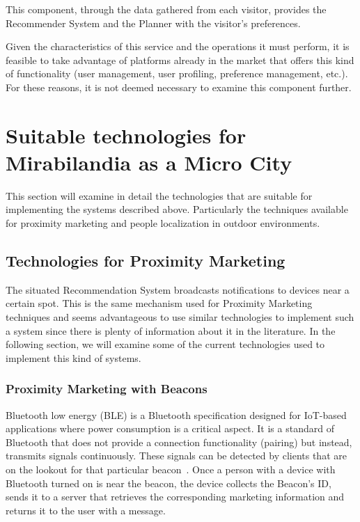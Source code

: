 This component, through the data gathered from each visitor, provides the Recommender System and the Planner with the visitor's preferences.

Given the characteristics of this service and the operations it must perform, it is feasible to take advantage of platforms already in the market that offers this kind of functionality (user management, user profiling, preference management, etc.).
For these reasons, it is not deemed necessary to examine this component further.

\section{Suitable technologies for Mirabilandia as a Micro City}
This section will examine in detail the technologies that are suitable for implementing the systems described above. Particularly the techniques
available for proximity marketing and people localization in outdoor environments.

\subsection{Technologies for Proximity Marketing}\label{sec:proximity-marketing-technologies}
The situated Recommendation System broadcasts notifications to devices near a certain spot. This is the same mechanism used for Proximity Marketing
techniques and seems advantageous to use similar technologies to implement such a system since there is plenty of information about it in the literature. In the following section, we will examine some of the current technologies used to implement this kind of systems.

\subsubsection{Proximity Marketing with Beacons}\label{sec:proximity-marketing-with-beacons}
Bluetooth low energy (BLE) is a Bluetooth specification designed for IoT-based applications where power consumption is a critical aspect. It is a
standard of Bluetooth that does not provide a connection functionality (pairing) but instead, transmits signals continuously. These signals can be
detected by clients that are on the lookout for that particular beacon~\cite{muddinagiri2020implementation}. Once a person with a device with
Bluetooth turned on is near the beacon, the device collects the Beacon's ID, sends it to a server that retrieves the corresponding marketing
information and returns it to the user with a message.

